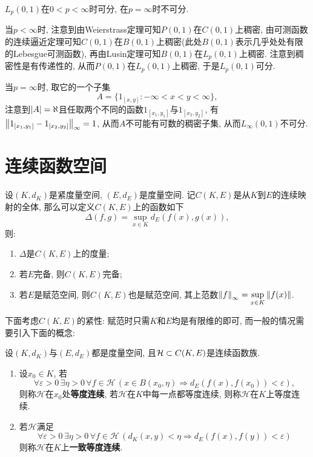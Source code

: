 	\begin{Proposition}
	$ L_p(0,1) $在$ 0<p<\infty $时可分, 在$ p=\infty $时不可分.
	\end{Proposition}
	\begin{Proof}
	当$ p<\infty $时, 注意到由Weierstrass定理可知$ P(0,1) $在$ C(0,1) $上稠密, 由可测函数的连续逼近定理可知$ C(0,1) $在$ B(0,1) $上稠密(此处$ B(0,1) $表示几乎处处有限的Lebesgue可测函数), 再由Lusin定理可知$ B(0,1) $在$ L_p(0,1) $上稠密. 注意到稠密性是有传递性的, 从而$ P(0,1) $在$ L_p(0,1) $上稠密, 于是$ L_p(0,1) $可分.
	
	当$ p=\infty $时, 取它的一个子集
	\[
	A=\{ 1_{[x,y]} : -\infty<x<y<\infty \},
	\]
	注意到$ \left| A \right| =\aleph $且任取两个不同的函数$ 1_{[x_1,y_1]} $与$ 1_{[x_2,y_2]} $, 有$ \left\| 1_{[x_1,y_1]}-1_{[x_2,y_2]} \right\|_\infty=1 $, 从而$ A $不可能有可数的稠密子集, 从而$ L_\infty(0,1) $不可分.
	\end{Proof}
	
\section{连续函数空间}
	
	设$ (K,d_K) $是紧度量空间, $ (E,d_E) $是度量空间. 记$ C(K,E) $是从$ K $到$ E $的连续映射的全体, 那么可以定义$ C(K,E) $上的函数如下
	\[
	\varDelta(f,g)=\sup_{x\in K}d_E(f(x),g(x)),
	\]
	则:
	\begin{enumerate}[(1)]
	\item $ \varDelta $是$ C(K,E) $上的度量;
	\item 若$ E $完备, 则$ C(K,E) $完备;
	\item 若$ E $是赋范空间, 则$ C(K,E) $也是赋范空间, 其上范数$ \left\| f \right\|_\infty=\sup\limits_{x\in K}\left\| f(x) \right\| $.
	\end{enumerate}
	下面考虑$ C(K,E) $的紧性: 赋范时只需$ K $和$ E $均是有限维的即可, 而一般的情况需要引入下面的概念:
	
	\begin{Definition}[等度连续]
	设$ (K,d_K) $与$ (E,d_E) $都是度量空间, 且$ \mathcal{H}\subset C(K,E) $是连续函数族.
	\begin{enumerate}[(1)]
	\item 设$ x_0\in K $, 若
	\[
	\forall\varepsilon>0\,\exists\eta>0\,\forall f\in\mathcal H\,(x\in B(x_0,\eta)\Rightarrow d_E(f(x),f(x_0))<\varepsilon),
	\]
	则称$ \mathcal H $在$ x_0 $处\textbf{等度连续}, 若$ \mathcal H $在$ K $中每一点都等度连续, 则称$ \mathcal H $在$ K $上等度连续.
	\item 若$ \mathcal H $满足
	\[
	\forall\varepsilon>0\,\exists\eta>0\,\forall f\in\mathcal H\,(d_K(x,y)<\eta\Rightarrow d_E(f(x),f(y))<\varepsilon)
	\]
	则称$ \mathcal H $在$ K $上\textbf{一致等度连续}.
	\end{enumerate}
	\end{Definition}
	
